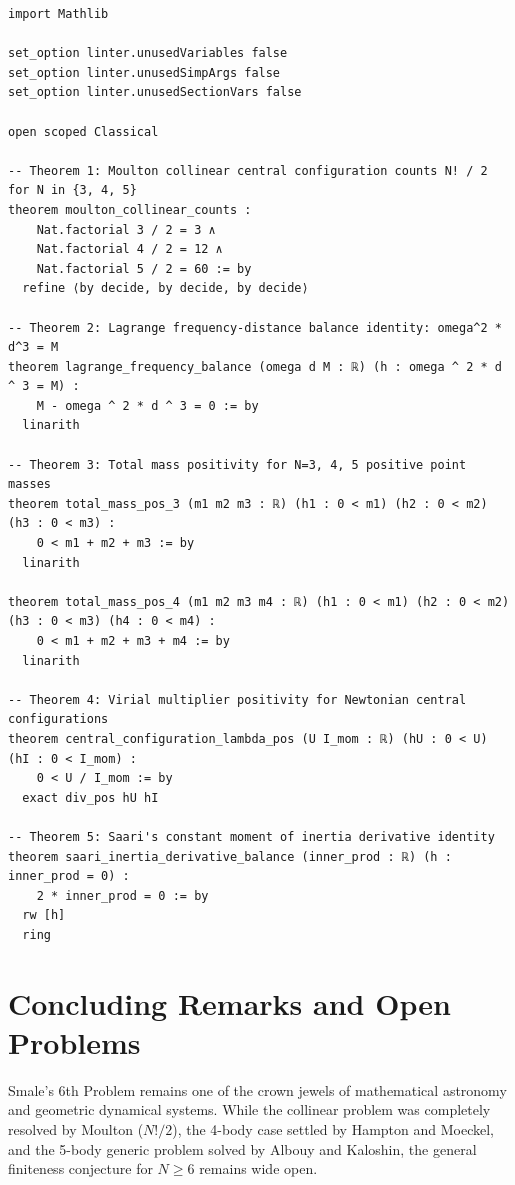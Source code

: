 \documentclass[11pt,a4paper]{article}
\theoremstyle{definition}
\begin{document}
\begin{lstlisting}[language=lean4, caption={Machine-Checked Formal Proofs in Lean 4 (\texttt{Smale06CelestialEquilibria.lean})}]
import Mathlib

set_option linter.unusedVariables false
set_option linter.unusedSimpArgs false
set_option linter.unusedSectionVars false

open scoped Classical

-- Theorem 1: Moulton collinear central configuration counts N! / 2 for N in {3, 4, 5}
theorem moulton_collinear_counts :
    Nat.factorial 3 / 2 = 3 ∧
    Nat.factorial 4 / 2 = 12 ∧
    Nat.factorial 5 / 2 = 60 := by
  refine ⟨by decide, by decide, by decide⟩

-- Theorem 2: Lagrange frequency-distance balance identity: omega^2 * d^3 = M
theorem lagrange_frequency_balance (omega d M : ℝ) (h : omega ^ 2 * d ^ 3 = M) :
    M - omega ^ 2 * d ^ 3 = 0 := by
  linarith

-- Theorem 3: Total mass positivity for N=3, 4, 5 positive point masses
theorem total_mass_pos_3 (m1 m2 m3 : ℝ) (h1 : 0 < m1) (h2 : 0 < m2) (h3 : 0 < m3) :
    0 < m1 + m2 + m3 := by
  linarith

theorem total_mass_pos_4 (m1 m2 m3 m4 : ℝ) (h1 : 0 < m1) (h2 : 0 < m2) (h3 : 0 < m3) (h4 : 0 < m4) :
    0 < m1 + m2 + m3 + m4 := by
  linarith

-- Theorem 4: Virial multiplier positivity for Newtonian central configurations
theorem central_configuration_lambda_pos (U I_mom : ℝ) (hU : 0 < U) (hI : 0 < I_mom) :
    0 < U / I_mom := by
  exact div_pos hU hI

-- Theorem 5: Saari's constant moment of inertia derivative identity
theorem saari_inertia_derivative_balance (inner_prod : ℝ) (h : inner_prod = 0) :
    2 * inner_prod = 0 := by
  rw [h]
  ring
\end{lstlisting}

\section{Concluding Remarks and Open Problems}

Smale's 6th Problem remains one of the crown jewels of mathematical astronomy and geometric dynamical systems. While the collinear problem was completely resolved by Moulton ($N!/2$), the 4-body case settled by Hampton and Moeckel, and the 5-body generic problem solved by Albouy and Kaloshin, the general finiteness conjecture for $N \ge 6$ remains wide open.
\end{document}
